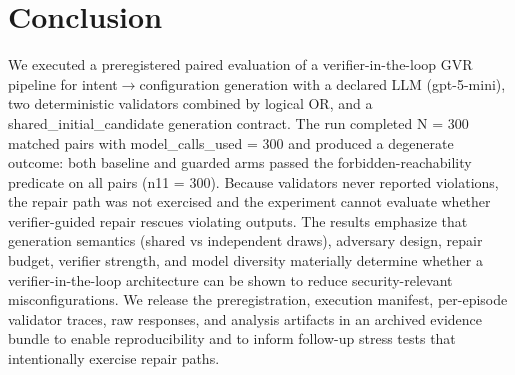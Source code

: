 \documentclass[conference]{IEEEtran}
\begin{document}
\section{Conclusion}
We executed a preregistered paired evaluation of a verifier-in-the-loop GVR pipeline for intent\ensuremath{\rightarrow}configuration generation with a declared LLM (gpt-5-mini), two deterministic validators combined by logical OR, and a shared\_initial\_candidate generation contract. The run completed N = 300 matched pairs with model\_calls\_used = 300 and produced a degenerate outcome: both baseline and guarded arms passed the forbidden-reachability predicate on all pairs (n11 = 300). Because validators never reported violations, the repair path was not exercised and the experiment cannot evaluate whether verifier-guided repair rescues violating outputs. The results emphasize that generation semantics (shared vs independent draws), adversary design, repair budget, verifier strength, and model diversity materially determine whether a verifier-in-the-loop architecture can be shown to reduce security-relevant misconfigurations. We release the preregistration, execution manifest, per-episode validator traces, raw responses, and analysis artifacts in an archived evidence bundle to enable reproducibility and to inform follow-up stress tests that intentionally exercise repair paths.
\end{document}
